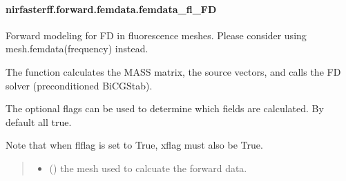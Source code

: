 \documentclass[letterpaper,10pt,english]{sphinxmanual}
\begin{document}
\sphinxstepscope


\paragraph{nirfasterff.forward.femdata.femdata\_fl\_FD}
\label{\detokenize{_autosummary/nirfasterff.forward.femdata.femdata_fl_FD:nirfasterff-forward-femdata-femdata-fl-fd}}\label{\detokenize{_autosummary/nirfasterff.forward.femdata.femdata_fl_FD::doc}}

\begin{fulllineitems}
\label{\detokenize{_autosummary/nirfasterff.forward.femdata.femdata_fl_FD:nirfasterff.forward.femdata.femdata_fl_FD}}
\pysigstartsignatures
\pysiglinewithargsret
{}
{\sphinxparamcomma {}\sphinxparamcomma {}\sphinxparamcomma {}\sphinxparamcomma {}\sphinxparamcomma {}\sphinxparamcomma {}}
{}
\pysigstopsignatures
\sphinxAtStartPar
Forward modeling for FD in fluorescence meshes. Please consider using mesh.femdata(frequency) instead.

\sphinxAtStartPar
The function calculates the MASS matrix, the source vectors, and calls the FD solver (preconditioned BiCGStab).

\sphinxAtStartPar
The optional flags can be used to determine which fields are calculated. By default all true.

\sphinxAtStartPar
Note that when flflag is set to True, xflag must also be True.
\begin{quote}\begin{description}
\begin{itemize}
\item {} 
\sphinxAtStartPar
{} () \textendash{} the mesh used to calcuate the forward data.


\end{itemize}
\end{description}
\end{quote}
\end{fulllineitems}
\end{document}
